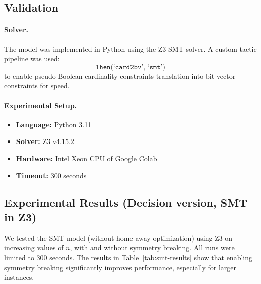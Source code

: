 \documentclass{article}
\begin{document}

\subsection{Validation}

\paragraph{Solver.}
The model was implemented in Python using the Z3 SMT solver. A custom tactic pipeline was used:
\[
\texttt{Then(`card2bv', `smt')}
\]
to enable pseudo-Boolean cardinality constraints  translation into bit-vector constraints for speed.

\paragraph{Experimental Setup.}
\begin{itemize}
    \item \textbf{Language:} Python 3.11
    \item \textbf{Solver:} Z3 v4.15.2
    \item \textbf{Hardware:} Intel Xeon CPU of Google Colab
    \item \textbf{Timeout:} 300 seconds
\end{itemize}

\subsection*{Experimental Results (Decision version, SMT in Z3)}

We tested the SMT model (without home-away optimization) using Z3 on increasing values of $n$, with and without symmetry breaking. All runs were limited to 300 seconds. The results in Table~\ref{tab:smt-results} show that enabling symmetry breaking significantly improves performance, especially for larger instances.
\end{document}
